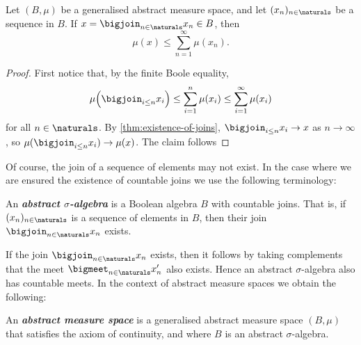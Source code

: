 \documentclass[article, a4paper, 11pt, oneside]{memoir}
\numberwithin{equation}{chapter}
\newcommand{\keyword}[1]{{\itshape\bfseries #1}}
\begin{document}
\begin{proposition}
    Let $(B,\mu)$ be a generalised abstract measure space, and let $(x_n)_{n\in\naturals}$ be a sequence in $B$. If $x = \bigjoin_{n\in\naturals} x_n \in B$, then
    \begin{equation*}
        \mu(x)
            \leq \sum_{n=1}^\infty \mu(x_n).
    \end{equation*}
\end{proposition}%

\begin{proof}
    First notice that, by the finite Boole equality,
    \begin{equation*}
        \mu \Bigl( \bigjoin_{i \leq n} x_i \Bigr)
            \leq \sum_{i=1}^n \mu(x_i)
            \leq \sum_{i=1}^\infty \mu(x_i)
    \end{equation*}
    for all $n \in \naturals$. By \cref{thm:existence-of-joins}, $\bigjoin_{i \leq n} x_i \to x$ as $n \to \infty$, so $\mu( \bigjoin_{i \leq n} x_i ) \to \mu(x)$. The claim follows
\end{proof}


Of course, the join of a sequence of elements may not exist. In the case where we are ensured the existence of countable joins we use the following terminology:

\begin{definition}
    \label{def:abstract-sigma-algebra}
    An \keyword{abstract $\sigma$-algebra} is a Boolean algebra $B$ with countable joins. That is, if $(x_n)_{n\in\naturals}$ is a sequence of elements in $B$, then their join $\bigjoin_{n\in\naturals} x_n$ exists.
\end{definition}
%
If the join $\bigjoin_{n\in\naturals} x_n$ exists, then it follows by taking complements that the meet $\bigmeet_{n\in\naturals} x_n'$ also exists. Hence an abstract $\sigma$-algebra also has countable meets. In the context of abstract measure spaces we obtain the following:

\begin{definition}
    \label{def:abstract-measure-space}
    An \keyword{abstract measure space} is a generalised abstract measure space $(B,\mu)$ that satisfies the axiom of continuity, and where $B$ is an abstract $\sigma$-algebra.
\end{definition}
\end{document}
